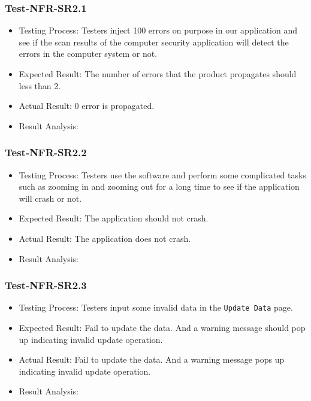 \documentclass[12pt, titlepage]{article}
\begin{document}
\subsubsection{Test-NFR-SR2.1}
\begin{itemize}
    \item Testing Process:  Testers inject 100 errors on purpose in our application and see
if the scan results of the computer security application will detect the errors in the computer
system or not.
    \item Expected Result: The number of errors that the product propagates should less than 2.
    \item Actual Result: 0 error is propagated. 
    \item Result Analysis: \pass
\end{itemize}

\subsubsection{Test-NFR-SR2.2}
\begin{itemize}

    \item Testing Process:  Testers use the software and perform some complicated tasks such as zooming in and zooming out for a long time to see if the application will crash or not.
    \item Expected Result: The application should not crash.
    \item Actual Result: The application does not crash.
    \item Result Analysis: \pass
\end{itemize}

\subsubsection{Test-NFR-SR2.3}
\begin{itemize}

    \item Testing Process:   Testers input some invalid data in the \verb|Update Data| page.
    \item Expected Result: Fail to update the data. And a warning message should pop up indicating invalid update
operation.
    \item Actual Result: Fail to update the data. And a warning message pops up indicating invalid update
operation.
    \item Result Analysis: \pass
\end{itemize}
\end{document}
